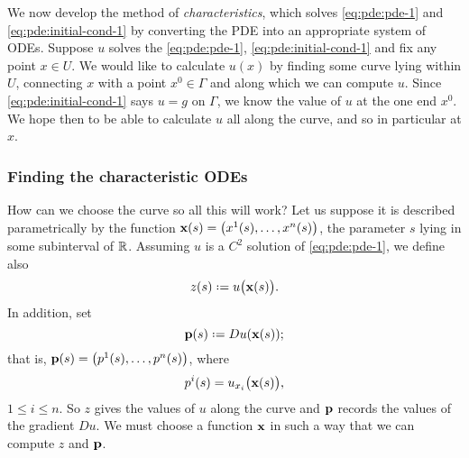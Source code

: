 We now develop the method of \emph{characteristics}, which solves
\eqref{eq:pde:pde-1} and \eqref{eq:pde:initial-cond-1} by converting the
PDE into an appropriate system of ODEs. Suppose \(u\) solves the
\eqref{eq:pde:pde-1}, \eqref{eq:pde:initial-cond-1} and fix any point
\(x\in U\). We would like to calculate \(u(x)\) by finding some curve lying
within \(U\), connecting \(x\) with a point \(x^0\in\Gamma\) and along
which we can compute \(u\). Since \eqref{eq:pde:initial-cond-1} says \(u=g\) on
\(\Gamma\), we know the value of \(u\) at the one end \(x^0\). We hope then
to be able to calculate \(u\) all along the curve, and so in particular at
\(x\).
\subsubsection{Finding the characteristic ODEs}
How can we choose the curve so all this will work? Let us suppose it is
described parametrically by the function
\(\mathbf{x}(s)=\bigl(x^1(s),\dotsc,x^n(s)\bigr)\), the parameter \(s\) lying in
some subinterval of \(\mathbb{R}\). Assuming \(u\) is a \(C^2\) solution of
\eqref{eq:pde:pde-1}, we define also
\[
  z(s)\defeq u\bigl(\bfx(s)\bigr).
\]
In addition, set
\[
  \bfp(s)\defeq Du(\bfx(s));
\]
that is, \(\mathbf{p}(s)=\bigl(p^1(s),\dotsc,p^n(s)\bigr)\), where
\begin{equation}
  \label{eq:pde:char-curve-p-i}
  p^i(s)=u_{x_i}\bigl(\mathbf{x}(s)\bigr),
\end{equation}
\(1\leq i\leq n\). So \(z\) gives the values of \(u\) along the curve and
\(\mathbf{p}\) records the values of the gradient \(Du\). We must choose a
function \(\mathbf{x}\) in such a way that we can compute \(z\) and \(\mathbf{p}\).

